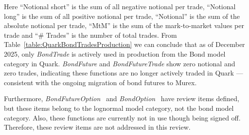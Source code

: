 \documentclass[reviewdoc]{pmv_report}  %
\begin{document}
Here ``Notional short'' is the sum of all negative notional per trade, ``Notional long'' is the sum of all positive notional per trade, ``Notional'' is the sum of the absolute notional per trade, ``MtM'' is the sum of the mark-to-market values per trade and ``\# Trades'' is the number of total trades. From Table~\ref{table:QuarkBondTradesProduction} we can conclude that as of December 2025, only \textit{BondTrade} is actively used in production from the Bond model category in Quark. \textit{BondFuture} and \textit{BondFutureTrade} show zero notional and zero trades, indicating these functions are no longer actively traded in Quark — consistent with the ongoing migration of bond futures to Murex.

Furthermore, \textit{BondFutureOption}~\cite{BondFutureOption} and \textit{BondOption}~\cite{Quark.BondOption} have review items defined, but these items belong to the lognormal model category, not the bond model category.
Also, these functions are currently not in use though being signed off.
Therefore, these review items are not addressed in this review.
\end{document}
